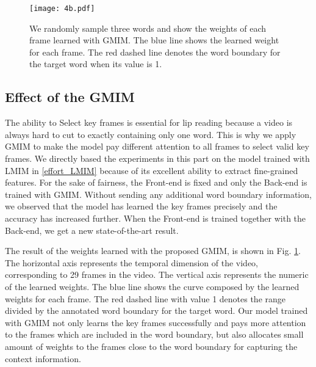 \documentclass[a4paper, 10pt, conference]{ieeeconf}      \usepackage{FG2020}
\begin{document}
\begin{figure}[b]
      \centering
      \texttt{[image: 4b.pdf]}
       \caption{We randomly sample three words and show the weights of each frame learned with GMIM. The blue line shows the learned weight for each frame. The red dashed line denotes the word boundary for the target word when its value is 1.}
    \label{fig:4b}
\end{figure}
\subsection{Effect of the GMIM}
The ability to Select key frames is essential for lip reading because a video is always hard to cut to exactly containing only one word. This is why we apply GMIM to make the model pay different attention to all frames to select valid key frames. We directly based the experiments in this part on the model trained with LMIM in \ref{effort_LMIM} because of its excellent ability to extract fine-grained features. For the sake of fairness, the Front-end is fixed and only the Back-end is trained with GMIM. Without sending any additional word boundary information, we observed that the model has learned the key frames precisely and the accuracy has increased further. When the Front-end is trained together with the Back-end, we get a new state-of-the-art result.

The result of the weights  learned with the proposed GMIM, is shown in Fig. \ref{fig:4b}. The horizontal axis represents the temporal dimension of the video, corresponding to 29 frames in the video. The vertical axis represents the numeric of the learned weights. The blue line shows the curve composed by the learned weights for each frame. The red dashed line with value 1 denotes the range divided by the annotated word boundary for the target word. Our model trained with GMIM not only learns the key frames successfully and pays more attention to the frames which are included in the word boundary, but also allocates small amount of weights to the frames close to the word boundary for capturing the context information. 
\end{document}
